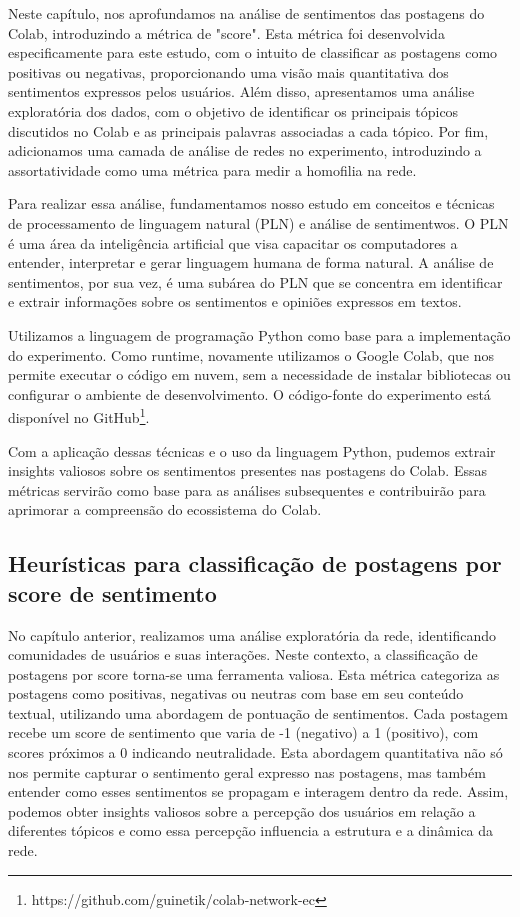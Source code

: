 Neste capítulo, nos aprofundamos na análise de sentimentos das postagens do Colab, introduzindo a métrica de "score". Esta métrica foi desenvolvida especificamente para este estudo, com o intuito de classificar as postagens como positivas ou negativas, proporcionando uma visão mais quantitativa dos sentimentos expressos pelos usuários. Além disso, apresentamos uma análise exploratória dos dados, com o objetivo de identificar os principais tópicos discutidos no Colab e as principais palavras associadas a cada tópico. Por fim, adicionamos uma camada de análise de redes no experimento, introduzindo a assortatividade como uma métrica para medir a homofilia na rede.

Para realizar essa análise, fundamentamos nosso estudo em conceitos e técnicas de processamento de linguagem natural (PLN) e análise de sentimentwos. O PLN é uma área da inteligência artificial que visa capacitar os computadores a entender, interpretar e gerar linguagem humana de forma natural. A análise de sentimentos, por sua vez, é uma subárea do PLN que se concentra em identificar e extrair informações sobre os sentimentos e opiniões expressos em textos.

Utilizamos a linguagem de programação Python como base para a implementação do experimento. Como runtime, novamente utilizamos o Google Colab, que nos permite executar o código em nuvem, sem a necessidade de instalar bibliotecas ou configurar o ambiente de desenvolvimento. O código-fonte do experimento está disponível no GitHub\footnote{https://github.com/guinetik/colab-network-ec}.

Com a aplicação dessas técnicas e o uso da linguagem Python, pudemos extrair insights valiosos sobre os sentimentos presentes nas postagens do Colab. Essas métricas servirão como base para as análises subsequentes e contribuirão para aprimorar a compreensão do ecossistema do Colab.

\subsection{Heurísticas para classificação de postagens por score de sentimento}

No capítulo anterior, realizamos uma análise exploratória da rede, identificando comunidades de usuários e suas interações. Neste contexto, a classificação de postagens por score torna-se uma ferramenta valiosa. Esta métrica categoriza as postagens como positivas, negativas ou neutras com base em seu conteúdo textual, utilizando uma abordagem de pontuação de sentimentos. Cada postagem recebe um score de sentimento que varia de -1 (negativo) a 1 (positivo), com scores próximos a 0 indicando neutralidade. Esta abordagem quantitativa não só nos permite capturar o sentimento geral expresso nas postagens, mas também entender como esses sentimentos se propagam e interagem dentro da rede. Assim, podemos obter insights valiosos sobre a percepção dos usuários em relação a diferentes tópicos e como essa percepção influencia a estrutura e a dinâmica da rede.

